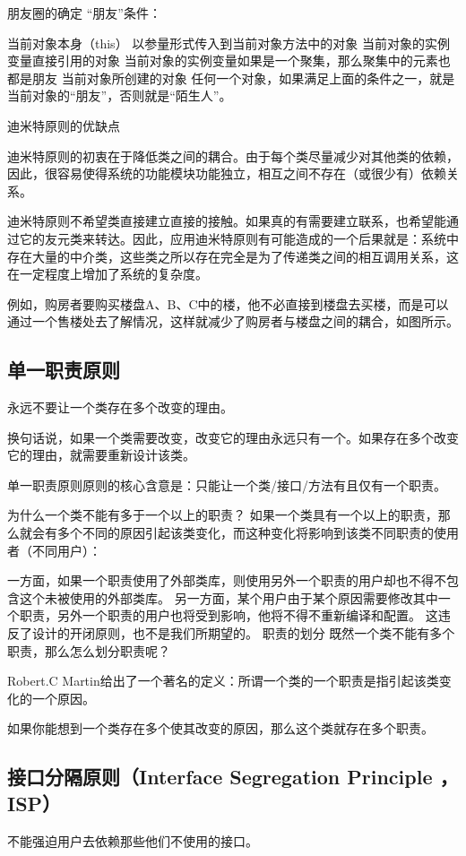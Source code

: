 朋友圈的确定
“朋友”条件：

当前对象本身（this）
以参量形式传入到当前对象方法中的对象
当前对象的实例变量直接引用的对象
当前对象的实例变量如果是一个聚集，那么聚集中的元素也都是朋友
当前对象所创建的对象
任何一个对象，如果满足上面的条件之一，就是当前对象的“朋友”，否则就是“陌生人”。

迪米特原则的优缺点

迪米特原则的初衷在于降低类之间的耦合。由于每个类尽量减少对其他类的依赖，因此，很容易使得系统的功能模块功能独立，相互之间不存在（或很少有）依赖关系。

迪米特原则不希望类直接建立直接的接触。如果真的有需要建立联系，也希望能通过它的友元类来转达。因此，应用迪米特原则有可能造成的一个后果就是：系统中存在大量的中介类，这些类之所以存在完全是为了传递类之间的相互调用关系，这在一定程度上增加了系统的复杂度。

例如，购房者要购买楼盘A、B、C中的楼，他不必直接到楼盘去买楼，而是可以通过一个售楼处去了解情况，这样就减少了购房者与楼盘之间的耦合，如图所示。

\subsection{单一职责原则}
永远不要让一个类存在多个改变的理由。

换句话说，如果一个类需要改变，改变它的理由永远只有一个。如果存在多个改变它的理由，就需要重新设计该类。

单一职责原则原则的核心含意是：只能让一个类/接口/方法有且仅有一个职责。

为什么一个类不能有多于一个以上的职责？
如果一个类具有一个以上的职责，那么就会有多个不同的原因引起该类变化，而这种变化将影响到该类不同职责的使用者（不同用户）：

一方面，如果一个职责使用了外部类库，则使用另外一个职责的用户却也不得不包含这个未被使用的外部类库。
另一方面，某个用户由于某个原因需要修改其中一个职责，另外一个职责的用户也将受到影响，他将不得不重新编译和配置。
这违反了设计的开闭原则，也不是我们所期望的。
职责的划分
既然一个类不能有多个职责，那么怎么划分职责呢？

Robert.C Martin给出了一个著名的定义：所谓一个类的一个职责是指引起该类变化的一个原因。

如果你能想到一个类存在多个使其改变的原因，那么这个类就存在多个职责。

\subsection{接口分隔原则（Interface Segregation Principle ，ISP）}
不能强迫用户去依赖那些他们不使用的接口。

